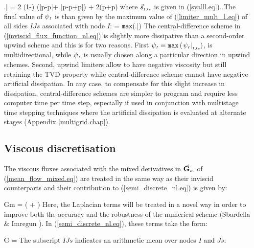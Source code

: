 %
\beq
  \left.\psi{}\right| =
  2
  {\left(1-\chi\right)
   \left(\left|p-p\right|+
         \left|p-p+\nabl p\cdot{}\right|\right)
   + 2\chi\left(p+p\right)}
  \label{limiter_mult_1.eq}
\eeq
%
 where $\vec{s}_{\mbox{\tiny $IJs$}}$ is given in (\ref{svalll.eq}).
 The final value of $\psi_{\mbox{\tiny $I$}}$ is than given by the maximum value
 of (\ref{limiter_mult_1.eq}) of all sides $IJs$ associated with node $I$:
%
\beq
  \psi{} = {\tt max}\left(\left.\psi{}\right|\right)
  \label{limiter_mult_2.eq}
\eeq
%
 The central-difference scheme in (\ref{inviscid_flux_function_nl.eq})
 is slightly more dissipative than a second-order upwind scheme and this
 is for two reasons. First
 $\psi_{\mbox{\tiny $I$}} = {\tt max}\left(\left.\psi_{\mbox{\tiny $I$}}\right|_{\mbox{\tiny $IJs$}}\right)$,
 is multidirectional, while $\psi_{\mbox{\tiny $I$}}$ is usually chosen along a particular
 direction in upwind schemes.
 Second, upwind limiters allow to have negative viscosity
 but still retaining the TVD property while central-difference scheme cannot
 have negative artificial dissipation.
 In any case, to compensate for this slight increase in dissipation,
 central-difference schemes are simpler to program and require
 less computer time per time step, especially if used in conjunction with
 multistage time stepping techniques where the artificial dissipation
 is evaluated at alternate stages (Appendix \ref{multigrid.chap}).
%
%
%
%
%
%
\subsection{Viscous discretisation}
\label{viscous_disretisation.subsec}
%
 The viscous fluxes associated with the mixed derivatives in
 $\vec{\bf G}_{\mbox{\tiny $m$}}$ of (\ref{mean_flow_mixed.eq})
 are treated in the same way as their inviscid
 counterparts and their contribution to (\ref{semi_discrete_nl.eq}) is given by:

%
\beq
  {\cal G}{\scriptstyle m} =
  \left( +
  \right)\cdot
  \label{viscous_mix_nl.eq}
\eeq
%
 Here, the Laplacian terms will be treated in a novel way in order to
 improve both the accuracy and the robustness of the numerical scheme
 (Sbardella \& Imregun ).
 In (\ref{semi_discrete_nl.eq}), these terms take the form:

%
\beq
 {\cal G} =
 \label{bbbbbbbb.eq}
\eeq
%
 The subscript $IJs$ indicates an arithmetic mean over nodes $I$ and $Js$:
%

